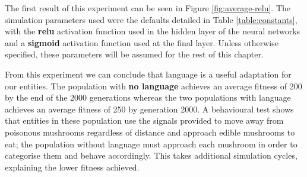 \documentclass[12pt,a4paper,twoside,openright]{report}
\begin{document}
The first result of this experiment can be seen in Figure \ref{fig:average-relu}. The simulation parameters used were the defaults detailed in Table \ref{table:constants}, with the {\bf relu} activation function used in the hidden layer of the neural networks and a {\bf sigmoid} activation function used at the final layer. Unless otherwise specified, these parameters will be assumed for the rest of this chapter.

From this experiment we can conclude that language is a useful adaptation for our entities. The population with {\bf no language} achieves an average fitness of 200 by the end of the 2000 generations whereas the two populations with language achieves an average fitness of 250 by generation 2000. A behavioural test shows that entities in these population use the signals provided to move away from poisonous mushrooms regardless of distance and approach edible mushrooms to eat; the population without language must approach each mushroom in order to categorise them and behave accordingly. This takes additional simulation cycles, explaining the lower fitness achieved.
\end{document}
